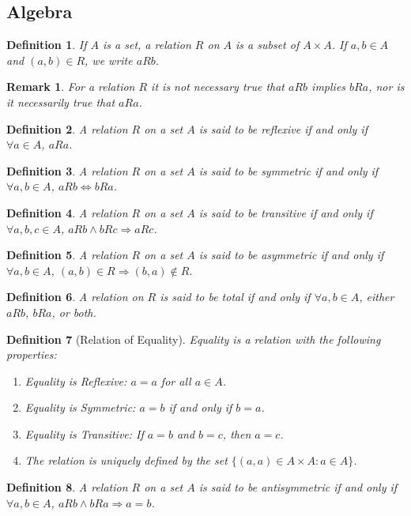 \documentclass[oneside]{book}
\theoremstyle{mystyle}
\newtheorem{definition}{Definition}[section]
\newtheorem{remark}{Remark}[section]
\begin{document}
\subsection{Algebra}
\begin{definition}
If $A$ is a set, a relation $R$ on $A$ is a subset of $A\times A$. If $a,b\in A$ and $(a,b)\in R$, we write $aR b$.
\end{definition}
\begin{remark}
For a relation $R$ it is not necessary true that $aRb$ implies $bRa$, nor is it necessarily true that $aRa$.
\end{remark}
\begin{definition}
A relation $R$ on a set $A$ is said to be reflexive if and only if $\forall a\in A$, $aRa$.
\end{definition}
\begin{definition}
A relation $R$ on a set $A$ is said to be symmetric if and only if $\forall a,b\in A$, $aRb\Leftrightarrow bRa$.
\end{definition}
\begin{definition}
A relation $R$ on a set $A$ is said to be transitive if and only if $\forall a,b,c\in A$, $aRb \land bRc \Rightarrow aRc$.
\end{definition}
\begin{definition}
A relation $R$ on a set $A$ is said to be asymmetric if and only if $\forall a,b\in A$, $(a,b)\in R\Rightarrow (b,a) \notin R$.
\end{definition}
\begin{definition}
A relation on $R$ is said to be total if and only if $\forall a,b \in A$, either $aRb$, $bRa$, or both.
\end{definition}
\begin{definition}[Relation of Equality]
Equality is a relation with the following properties:
\begin{enumerate}
\item Equality is Reflexive: $a=a$ for all $a\in A$.
\item Equality is Symmetric: $a=b$ if and only if $b=a$.
\item Equality is Transitive: If $a=b$ and $b=c$, then $a=c$.
\item The relation is uniquely defined by the set $\{(a,a)\in A\times A:a\in A\}$.
\end{enumerate}
\end{definition}
\begin{definition}
A relation $R$ on a set $A$ is said to be antisymmetric if and only if $\forall a,b \in A$, $aRb\land bRa\Rightarrow a=b$.
\end{definition}
\end{document}
